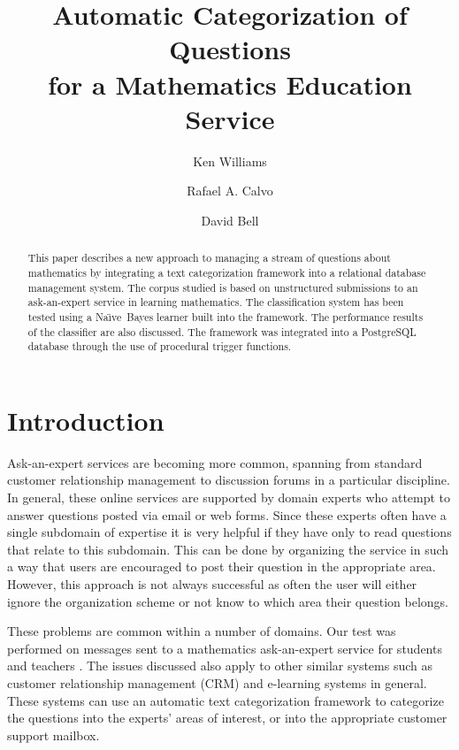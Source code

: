 \documentclass{ios}
\newcommand{\naive}{Na\"\i ve}
\begin{document}
\pagestyle{empty}

\title{Automatic Categorization of Questions \\ for a Mathematics Education Service}

\author{Ken Williams \and Rafael A. Calvo \and David Bell}


\address{
Web Engineering Group\\
The University of Sydney\\
Bldg J03, Sydney NSW 2006\\[1ex]
{\em {\{kenw,rafa\}}@ee.usyd.edu.au},
{\em dave@student.usyd.edu.au}
}

\maketitle

\begin{abstract}
This paper describes a new approach to managing a stream of questions about 
mathematics by integrating a text categorization framework into a relational database 
management system. The corpus studied is based on unstructured submissions to an 
ask-an-expert service in learning mathematics. The classification system has 
been tested using a \naive\ Bayes learner built into the framework. The 
performance results of the classifier are also discussed. The framework was integrated 
into a PostgreSQL database through the use of procedural trigger functions.
\end{abstract}


\section{Introduction}

Ask-an-expert services are becoming more common, spanning from standard 
customer relationship management to discussion forums in a particular discipline. In 
general, these online services are supported by domain experts who attempt to answer 
questions posted via email or web forms. Since these experts often have a single subdomain of expertise it is 
very helpful if they have only to read questions that relate to this subdomain. This can be 
done by organizing the service in such a way that users are encouraged to post their 
question in the appropriate area. However, this approach is not always successful as 
often the user will either ignore the organization scheme or not know to which area their 
question belongs. 

These problems are common within a number of domains. Our test was performed on 
messages sent to a mathematics ask-an-expert
service for students and teachers \cite{drmath}. The issues 
discussed also apply to other similar systems such as customer relationship 
management (CRM) and e-learning systems in general. These systems can use an 
automatic text categorization framework to categorize the questions into the experts' 
areas of interest, or into the appropriate customer support mailbox. 
\end{document}
